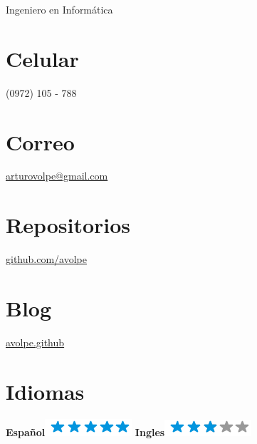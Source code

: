 \documentclass[]{friggeri-cv}
\begin{document}
{Ingeniero en Informática}


\begin{aside}
    \section{Celular}
        (0972) 105 - 788
        ~
    \section{Correo}
        \href{mailto:arturovolpe@gmail.com}{arturovolpe@gmail.com}
        ~
    \section{Repositorios}
        \href{https://github.com/avolpe}{github.com/avolpe}
        ~
    \section{Blog}
        \href{https://avolpe.github.io}{avolpe.github}
        ~
\section{Idiomas}
\textbf{Español}\includegraphics[scale=0.40]{img/5stars.png}
\textbf{Ingles}\includegraphics[scale=0.40]{img/3stars.png}
\end{aside}
\end{document}
